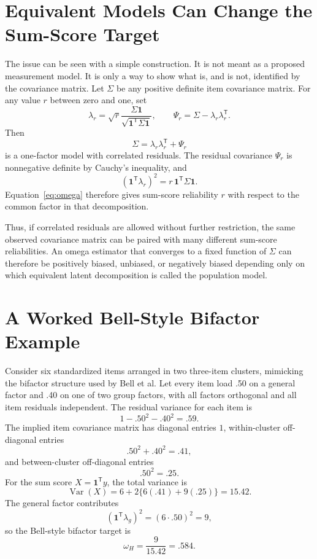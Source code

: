 \documentclass[11pt]{article}
\newcommand{\Var}{\operatorname{Var}}
\newcommand{\T}{^{\mathsf T}}
\newcommand{\one}{\mathbf{1}}
\begin{document}
\section{Equivalent Models Can Change the Sum-Score Target}

The issue can be seen with a simple construction. It is not meant as a proposed
measurement model. It is only a way to show what is, and is not, identified by
the covariance matrix. Let \(\Sigma\) be any positive definite item covariance
matrix. For any value \(r\) between zero and one, set
\[
  \lambda_r=\sqrt{r}\frac{\Sigma\one}{\sqrt{\one\T\Sigma\one}},
  \qquad
  \Psi_r=\Sigma-\lambda_r\lambda_r\T .
\]
Then
\[
  \Sigma=\lambda_r\lambda_r\T+\Psi_r
\]
is a one-factor model with correlated residuals. The residual covariance
\(\Psi_r\) is nonnegative definite by Cauchy's inequality, and
\[
  (\one\T\lambda_r)^2=r\,\one\T\Sigma\one .
\]
Equation~\eqref{eq:omega} therefore gives sum-score reliability \(r\) with
respect to the common factor in that decomposition.

Thus, if correlated residuals are allowed without further restriction, the same
observed covariance matrix can be paired with many different sum-score
reliabilities. An omega estimator that converges to a fixed function of
\(\Sigma\) can therefore be positively biased, unbiased, or negatively biased
depending only on which equivalent latent decomposition is called the population
model.

\section{A Worked Bell-Style Bifactor Example}

Consider six standardized items arranged in two three-item clusters, mimicking
the bifactor structure used by Bell et al. Let every item load .50 on a general
factor and .40 on one of two group factors, with all factors orthogonal and all
item residuals independent. The residual variance for each item is
\[
  1-.50^2-.40^2=.59 .
\]
The implied item covariance matrix has diagonal entries \(1\), within-cluster
off-diagonal entries
\[
  .50^2+.40^2=.41 ,
\]
and between-cluster off-diagonal entries
\[
  .50^2=.25 .
\]
For the sum score \(X=\one\T y\), the total variance is
\[
  \Var(X)
  =
  6+2\{6(.41)+9(.25)\}
  =
  15.42 .
\]
The general factor contributes
\[
  (\one\T\lambda_g)^2=(6\cdot .50)^2=9 ,
\]
so the Bell-style bifactor target is
\[
  \omega_H=\frac{9}{15.42}=.584 .
\]
\end{document}
